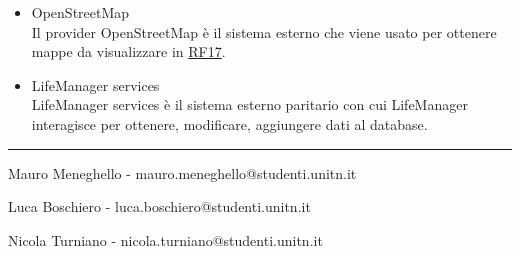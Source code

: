 \documentclass[a4paper,12pt]{article}
\begin{document}
\begin{itemize}
 \item {\sffamily OpenStreetMap}\\
    Il provider OpenStreetMap è il sistema esterno che viene usato per ottenere mappe da visualizzare in \hyperlink{RF17}{RF17}.

\item {\sffamily LifeManager services}\\
    LifeManager services è il sistema esterno paritario con cui LifeManager interagisce per ottenere, modificare, aggiungere dati al database. 

\end{itemize}

\vspace{15cm}
\hrule
\vspace{0.5cm}


Mauro Meneghello - mauro.meneghello@studenti.unitn.it

Luca Boschiero -  luca.boschiero@studenti.unitn.it

Nicola Turniano - nicola.turniano@studenti.unitn.it

 
\end{document}
